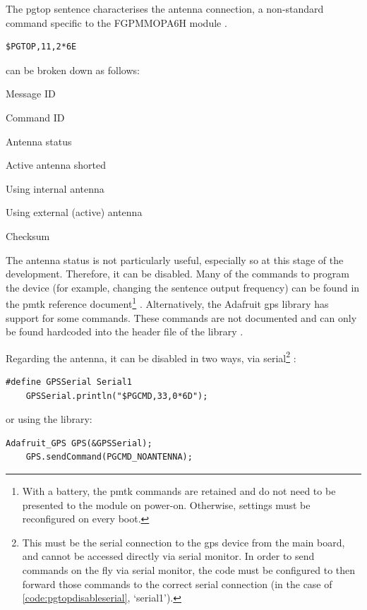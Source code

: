 The \gls{pgtop} sentence characterises the antenna connection, a non-standard command specific to the FGPMMOPA6H module \cite{gtop:pa6h}.
\begin{lstlisting}[label=code:pgtopsentence, caption={\acrshort{nmea} \gls{pgtop} sentence example},captionpos=b]
    $PGTOP,11,2*6E
\end{lstlisting}
 can be broken down as follows:
\begin{description}[align=left, labelwidth=2cm,labelindent=1cm]
    \item[\gls{pgtop}] Message ID
    \item[11] Command ID
    \item[2] Antenna status
        \begin{description}[align=left, labelwidth=0.75cm,labelindent=2.25cm]
            \item[1] Active antenna shorted
            \item[2] Using internal antenna
            \item[3] Using external (active) antenna
        \end{description}
    \item[6E] Checksum
\end{description}

The antenna status is not particularly useful, especially so at this stage of the development.
Therefore, it can be disabled. Many of the commands to program the device (for example,
changing the sentence output frequency) can be found in the \gls{pmtk} reference document\footnote{
    With a battery, the \gls{pmtk} commands are retained and do not
    need to be presented to the module on power-on. Otherwise, settings must be reconfigured on
    every boot.} \cite{gtop:pmtk}.
Alternatively, the Adafruit \acrshort{gps} library \cite{adafruit:gpslibrary} has support for some commands.
These commands are not documented and can only be found hardcoded into the header file of the
library \cite{adafruit:gpspmtk}.

Regarding the antenna, it can be disabled in two ways, via serial\footnote{This must be the serial
    connection to the \acrshort{gps} device from the main board, and cannot be accessed directly via serial monitor.
    In order to send commands on the fly via serial monitor, the code must be configured to then forward those commands
    to the correct serial connection (in the case of \cref{code:pgtopdisableserial}, `serial1').} :
\begin{lstlisting}[label=code:pgtopdisableserial, caption=\relax,captionpos=b]
    #define GPSSerial Serial1
    GPSSerial.println("$PGCMD,33,0*6D");
\end{lstlisting}
or using the library:
\begin{lstlisting}[label=code:pgtopdisablecmd, caption=\relax,captionpos=b]    
    Adafruit_GPS GPS(&GPSSerial);
    GPS.sendCommand(PGCMD_NOANTENNA);    
\end{lstlisting}

